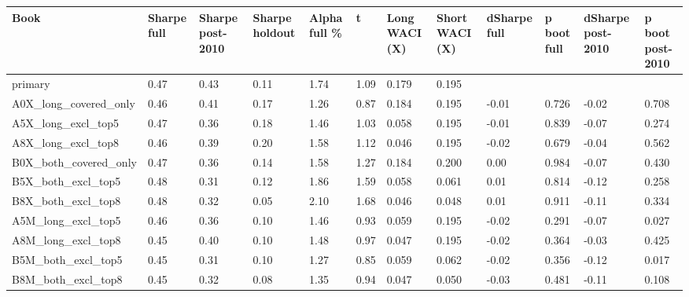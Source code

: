 \begin{tabular}{llllllllllll}
\toprule
Book & Sharpe full & Sharpe post-2010 & Sharpe holdout & Alpha full \% & t & Long WACI (X) & Short WACI (X) & dSharpe full & p boot full & dSharpe post-2010 & p boot post-2010 \\
\midrule
primary & 0.47 & 0.43 & 0.11 & 1.74 & 1.09 & 0.179 & 0.195 &  &  &  &  \\
A0X\_long\_covered\_only & 0.46 & 0.41 & 0.17 & 1.26 & 0.87 & 0.184 & 0.195 & -0.01 & 0.726 & -0.02 & 0.708 \\
A5X\_long\_excl\_top5 & 0.47 & 0.36 & 0.18 & 1.46 & 1.03 & 0.058 & 0.195 & -0.01 & 0.839 & -0.07 & 0.274 \\
A8X\_long\_excl\_top8 & 0.46 & 0.39 & 0.20 & 1.58 & 1.12 & 0.046 & 0.195 & -0.02 & 0.679 & -0.04 & 0.562 \\
B0X\_both\_covered\_only & 0.47 & 0.36 & 0.14 & 1.58 & 1.27 & 0.184 & 0.200 & 0.00 & 0.984 & -0.07 & 0.430 \\
B5X\_both\_excl\_top5 & 0.48 & 0.31 & 0.12 & 1.86 & 1.59 & 0.058 & 0.061 & 0.01 & 0.814 & -0.12 & 0.258 \\
B8X\_both\_excl\_top8 & 0.48 & 0.32 & 0.05 & 2.10 & 1.68 & 0.046 & 0.048 & 0.01 & 0.911 & -0.11 & 0.334 \\
A5M\_long\_excl\_top5 & 0.46 & 0.36 & 0.10 & 1.46 & 0.93 & 0.059 & 0.195 & -0.02 & 0.291 & -0.07 & 0.027 \\
A8M\_long\_excl\_top8 & 0.45 & 0.40 & 0.10 & 1.48 & 0.97 & 0.047 & 0.195 & -0.02 & 0.364 & -0.03 & 0.425 \\
B5M\_both\_excl\_top5 & 0.45 & 0.31 & 0.10 & 1.27 & 0.85 & 0.059 & 0.062 & -0.02 & 0.356 & -0.12 & 0.017 \\
B8M\_both\_excl\_top8 & 0.45 & 0.32 & 0.08 & 1.35 & 0.94 & 0.047 & 0.050 & -0.03 & 0.481 & -0.11 & 0.108 \\
\bottomrule
\end{tabular}
